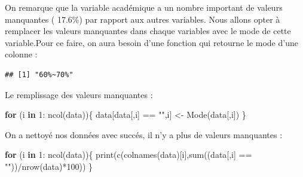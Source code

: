 \documentclass[
]{article}
\newenvironment{Shaded}{\begin{snugshade}}{\end{snugshade}}
\newcommand{\CommentTok}[1]{\textcolor[rgb]{0.56,0.35,0.01}{\textit{#1}}}
\newcommand{\ControlFlowTok}[1]{\textcolor[rgb]{0.13,0.29,0.53}{\textbf{#1}}}
\newcommand{\DecValTok}[1]{\textcolor[rgb]{0.00,0.00,0.81}{#1}}
\newcommand{\FunctionTok}[1]{\textcolor[rgb]{0.00,0.00,0.00}{#1}}
\newcommand{\NormalTok}[1]{#1}
\newcommand{\OtherTok}[1]{\textcolor[rgb]{0.56,0.35,0.01}{#1}}
\newcommand{\SpecialCharTok}[1]{\textcolor[rgb]{0.00,0.00,0.00}{#1}}
\newcommand{\StringTok}[1]{\textcolor[rgb]{0.31,0.60,0.02}{#1}}
\begin{document}
On remarque que la variable académique a un nombre important de valeurs
manquantes ( 17.6\%) par rapport aux autres variables. Nous allons opter
à remplacer les valeurs manquantes dans chaque variables avec le mode de
cette variable.Pour ce faire, on aura besoin d'une fonction qui retourne
le mode d'une colonne :

\begin{Shaded}
\end{Shaded}

\begin{verbatim}
## [1] "60%~70%"
\end{verbatim}

Le remplissage des valeurs manquantes :

\begin{Shaded}
\begin{Highlighting}[]
\ControlFlowTok{for}\NormalTok{ (i }\ControlFlowTok{in} \DecValTok{1}\SpecialCharTok{:} \FunctionTok{ncol}\NormalTok{(data))\{}
\NormalTok{  data[data[,i] }\SpecialCharTok{==} \StringTok{""}\NormalTok{,i] }\OtherTok{\textless{}{-}} \FunctionTok{Mode}\NormalTok{(data[,i])}
\NormalTok{\}}
\end{Highlighting}
\end{Shaded}

On a nettoyé nos données avec succés, il n'y a plus de valeurs
manquantes :

\begin{Shaded}
\begin{Highlighting}[]
\ControlFlowTok{for}\NormalTok{ (i }\ControlFlowTok{in} \DecValTok{1}\SpecialCharTok{:} \FunctionTok{ncol}\NormalTok{(data))\{}
  \FunctionTok{print}\NormalTok{(}\FunctionTok{c}\NormalTok{(}\FunctionTok{colnames}\NormalTok{(data)[i],}\FunctionTok{sum}\NormalTok{((data[,i] }\SpecialCharTok{==} \StringTok{""}\NormalTok{))}\SpecialCharTok{/}\FunctionTok{nrow}\NormalTok{(data)}\SpecialCharTok{*}\DecValTok{100}\NormalTok{))}
\NormalTok{\}}
\end{Highlighting}
\end{Shaded}
\end{document}
